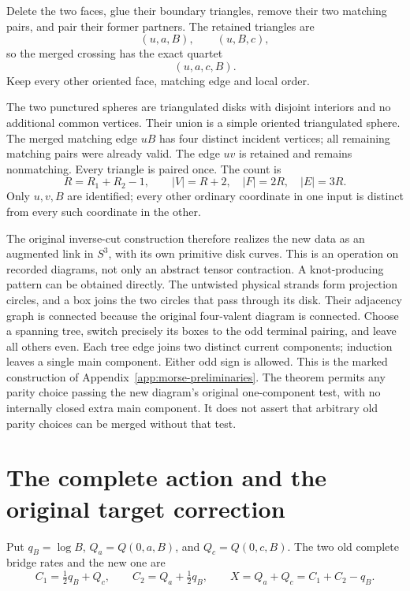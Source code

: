Delete the two faces, glue their boundary triangles, remove their two
matching pairs, and pair their former partners. The retained triangles
are \[
                  (u,a,B),\qquad(u,B,c),
\] so the merged crossing has the exact quartet \begin{equation}\label{pts:eq-7}
(u,a,c,B).
\end{equation} Keep every other oriented face, matching edge and local order.

The two punctured spheres are triangulated disks with disjoint interiors
and no additional common vertices. Their union is a simple oriented
triangulated sphere. The merged matching edge \(uB\) has four distinct
incident vertices; all remaining matching pairs were already valid. The
edge \(uv\) is retained and remains nonmatching. Every triangle is
paired once. The count is \begin{equation}\label{pts:eq-8}
R=R_1+R_2-1,\qquad
 |V|=R+2,\quad |F|=2R,\quad |E|=3R.
\end{equation} Only \(u,v,B\) are identified; every other ordinary coordinate in one
input is distinct from every such coordinate in the other.

The original inverse-cut construction therefore realizes the new data as
an augmented link in \(S^3\), with its own primitive disk curves. This
is an operation on recorded diagrams, not only an abstract tensor
contraction. A knot-producing pattern can be obtained directly. The
untwisted physical strands form projection circles, and a box joins the
two circles that pass through its disk. Their adjacency graph is
connected because the original four-valent diagram is connected. Choose
a spanning tree, switch precisely its boxes to the odd terminal pairing,
and leave all others even. Each tree edge joins two distinct current
components; induction leaves a single main component. Either odd sign is
allowed. This is the marked construction of
Appendix~\ref{app:morse-preliminaries}. The theorem permits any parity choice passing the
new diagram's original one-component test, with no internally closed
extra main component. It does not assert that arbitrary old parity
choices can be merged without that test.

\section{The complete action and the original target
correction}\label{pts:sec-3}

Put \(q_B=\log B\), \(Q_a=Q(0,a,B)\), and \(Q_c=Q(0,c,B)\). The two old
complete bridge rates and the new one are \begin{equation}\label{pts:eq-9}
C_1=\tfrac12q_B+Q_c,\qquad
 C_2=Q_a+\tfrac12q_B,\qquad
 X=Q_a+Q_c=C_1+C_2-q_B.
\end{equation}

